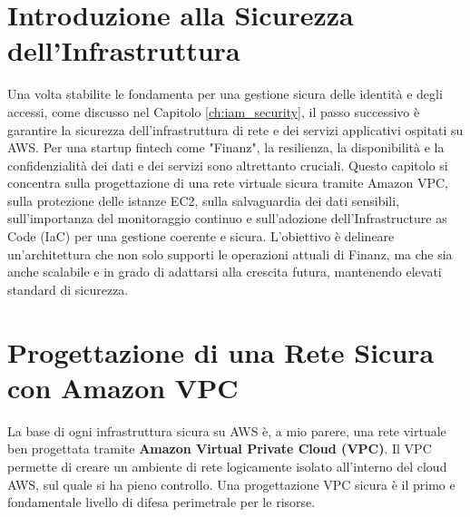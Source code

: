 \section{Introduzione alla Sicurezza dell'Infrastruttura}
Una volta stabilite le fondamenta per una gestione sicura delle identità e degli accessi, come discusso nel Capitolo \ref{ch:iam_security}, il passo successivo è garantire la sicurezza dell'infrastruttura di rete e dei servizi applicativi ospitati su AWS. Per una startup fintech come "Finanz", la resilienza, la disponibilità e la confidenzialità dei dati e dei servizi sono altrettanto cruciali. Questo capitolo si concentra sulla progettazione di una rete virtuale sicura tramite Amazon VPC, sulla protezione delle istanze EC2, sulla salvaguardia dei dati sensibili, sull'importanza del monitoraggio continuo e sull'adozione dell'Infrastructure as Code (IaC) per una gestione coerente e sicura. L'obiettivo è delineare un'architettura che non solo supporti le operazioni attuali di Finanz, ma che sia anche scalabile e in grado di adattarsi alla crescita futura, mantenendo elevati standard di sicurezza.


\section{Progettazione di una Rete Sicura con Amazon VPC}
\label{sec:vpc-design_cap2}
La base di ogni infrastruttura sicura su AWS è, a mio parere, una rete virtuale ben progettata tramite \textbf{Amazon Virtual Private Cloud (VPC)}. Il VPC permette di creare un ambiente di rete logicamente isolato all'interno del cloud AWS, sul quale si ha pieno controllo. Una progettazione VPC sicura è il primo e fondamentale livello di difesa perimetrale per le risorse.

